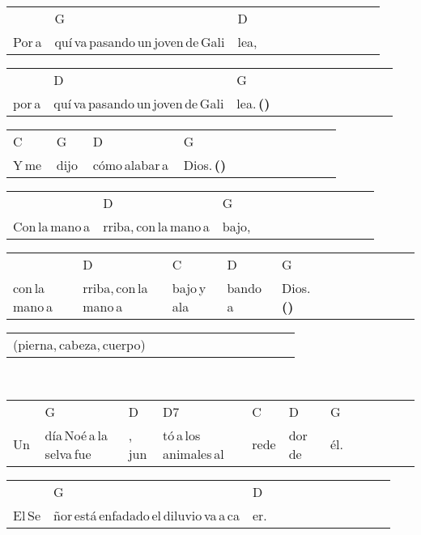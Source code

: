 \begin{multicols}{2}
\noindent
\begin{minipage}{\columnwidth}
\noindent
\noindent
\begin{tabular}{llllllllllll}
&G&D\\
Por\,a&quí\,va\,pasando\,un\,joven\,de\,Gali&lea,
\end{tabular}

\noindent
\begin{tabular}{llllllllllll}
&D&G\\
por\,a&quí\,va\,pasando\,un\,joven\,de\,Gali&lea.\,\textbf{(\texttimes2)}\\\hline
\end{tabular}

\noindent
\begin{tabular}{llllllllllll}
C&G&D&G\\
Y\,me\,&dijo\,&cómo\,alabar\,a\,&Dios.\,\textbf{(\texttimes2)}\\\hline
\end{tabular}

\noindent
\begin{tabular}{llllllllllll}
&D&G\\
Con\,la\,mano\,a&rriba,\,con\,la\,mano\,a&bajo,
\end{tabular}

\noindent
\begin{tabular}{llllllllllll}
&D&C&D&G\\
con\,la\,mano\,a&rriba,\,con\,la\,mano\,a&bajo\,y\,ala&bando\,a\,&Dios.\textbf{(\texttimes2)}\\\hline
\end{tabular}

\noindent
\begin{tabular}{llllllllllll}
\\
(pierna,\,cabeza,\,cuerpo)
\end{tabular}
\end{minipage}\\

\noindent
\begin{minipage}{\columnwidth}
\noindent
\noindent
\begin{tabular}{llllllllllll}
&G&D&D7&C&D&G\\
Un\,&día\,Noé\,a\,la\,selva\,fue&,\,jun&tó\,a\,los\,animales\,al&rede&dor\,de\,&él.
\end{tabular}

\noindent
\begin{tabular}{llllllllllll}
&G&D\\
El\,Se&ñor\,está\,enfadado\,el\,diluvio\,va\,a\,ca&er.
\end{tabular}


\end{minipage}
\end{multicols}
